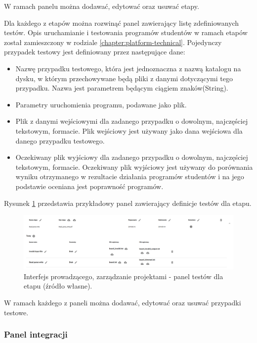 W ramach panelu można dodawać, edytować oraz usuwać etapy.


Dla każdego z etapów można rozwinąć panel zawierający listę zdefiniowanych testów.
Opis uruchamianie i testowania programów studentów w ramach etapów został zamieszczony w rodziale \ref{chapter:platform-technical}.
Pojedynczy przypadek testowy jest definiowany przez następujące dane:
\begin {itemize}
    \item Nazwę przypadku testowego, która jest jednoznaczna z nazwą katalogu na dysku, w którym przechowywane będą pliki z danymi dotyczącymi tego przypadku.
    Nazwa jest parametrem będącym ciągiem znaków(String).
    \item Parametry uruchomienia programu, podawane jako plik.
    \item Plik z danymi wejściowymi dla zadanego przypadku o dowolnym, najczęściej tekstowym, formacie.
    Plik wejściowy jest używany jako dana wejściowa dla danego przypadku testowego.
    \item Oczekiwany plik wyjściowy dla zadanego przypadku o dowolnym, najczęściej tekstowym, formacie.
    Oczekiwany plik wyjściowy jest używany do porównania wyniku otrzymanego w rezultacie działania programów studentów i na jego podstawie oceniana jest poprawność programów.
\end {itemize}

Rysunek \ref{fig:lecturer_stages_tests} przedstawia przykładowy panel zawierający definicje testów dla etapu.

\begin{figure}[h]
    \centering
    \includegraphics[width = 15cm]{chapter04/lecturer_stages_tests.png}
    \caption{Interfejs prowadzącego, zarządzanie projektami - panel testów dla etapu (źródło własne).}
    \label{fig:lecturer_stages_tests}
\end{figure}

W ramach każdego z paneli można dodawać, edytować oraz usuwać przypadki testowe.

\subsubsection{Panel integracji}

